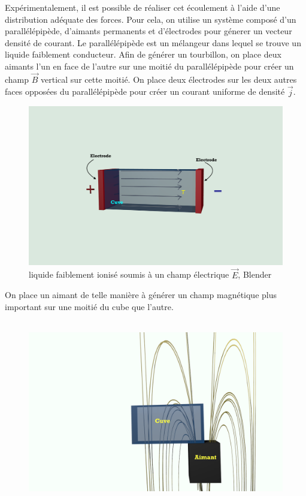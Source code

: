 \documentclass[a4paper,12pt,titlepage]{report}
\begin{document}
\begin{onehalfspace}
Expérimentalement, il est possible de réaliser cet écoulement à l’aide d’une distribution adéquate des forces. Pour cela, on utilise un système composé d'un parallélépipède, d’aimants permanents et d’électrodes pour génerer un vecteur densité de courant. Le parallélépipède est un mélangeur dans lequel se trouve un liquide faiblement conducteur.
Afin de générer un tourbillon, on place deux aimants l’un en face de l’autre sur une moitié du parallélépipède pour créer un champ $\vec{B}$ vertical sur cette moitié. On place deux électrodes sur les deux autres faces opposées du parallélépipède pour créer un courant uniforme de densité $\vec{j}$.
\begin{figure}[!h]
	\begin{center}
	\centering	
		\includegraphics[height = 7cm, keepaspectratio]{graphes/blender_cuve_champvec.png}
		\caption{liquide faiblement ionisé soumis à un champ électrique $\vec{E}$, Blender}
	\end{center}
\end{figure}
\newline
On place un aimant de telle manière à générer un champ magnétique plus important sur une moitié du cube que l'autre.
\begin{figure}[!h]
	\begin{center}
	\centering
		\includegraphics[height = 8cm, keepaspectratio]{graphes/blender_cuve_mag2.png} 

\end{center}
\end{figure}
\end{onehalfspace}
\end{document}
